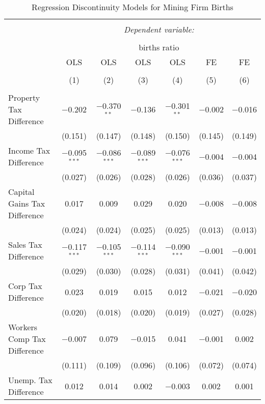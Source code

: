 
\begin{table}[!htbp] \centering 
  \caption{Regression Discontinuity Models for  Mining Firm Births} 
  \label{21rd} 
\begin{tabular}{@{\extracolsep{5pt}}lcccccc} 
\\[-1.8ex]\hline 
\hline \\[-1.8ex] 
 & \multicolumn{6}{c}{\textit{Dependent variable:}} \\ 
\cline{2-7} 
\\[-1.8ex] & \multicolumn{6}{c}{births ratio} \\ 
 & OLS & OLS & OLS & OLS & FE & FE \\ 
\\[-1.8ex] & (1) & (2) & (3) & (4) & (5) & (6)\\ 
\hline \\[-1.8ex] 
 Property Tax Difference & $-$0.202 & $-$0.370$^{**}$ & $-$0.136 & $-$0.301$^{**}$ & $-$0.002 & $-$0.016 \\ 
  & (0.151) & (0.147) & (0.148) & (0.150) & (0.145) & (0.149) \\ 
  Income Tax Difference & $-$0.095$^{***}$ & $-$0.086$^{***}$ & $-$0.089$^{***}$ & $-$0.076$^{***}$ & $-$0.004 & $-$0.004 \\ 
  & (0.027) & (0.026) & (0.028) & (0.026) & (0.036) & (0.037) \\ 
  Capital Gains Tax Difference & 0.017 & 0.009 & 0.029 & 0.020 & $-$0.008 & $-$0.008 \\ 
  & (0.024) & (0.024) & (0.025) & (0.025) & (0.013) & (0.013) \\ 
  Sales Tax Difference & $-$0.117$^{***}$ & $-$0.105$^{***}$ & $-$0.114$^{***}$ & $-$0.090$^{***}$ & $-$0.001 & $-$0.001 \\ 
  & (0.029) & (0.030) & (0.028) & (0.031) & (0.041) & (0.042) \\ 
  Corp Tax Difference & 0.023 & 0.019 & 0.015 & 0.012 & $-$0.021 & $-$0.020 \\ 
  & (0.020) & (0.018) & (0.020) & (0.019) & (0.027) & (0.028) \\ 
  Workers Comp Tax Difference & $-$0.007 & 0.079 & $-$0.015 & 0.041 & $-$0.001 & 0.002 \\ 
  & (0.111) & (0.109) & (0.096) & (0.106) & (0.072) & (0.074) \\ 
  Unemp. Tax Difference & 0.012 & 0.014 & 0.002 & $-$0.003 & 0.002 & 0.001 \\ 

\end{tabular}
\end{table}
